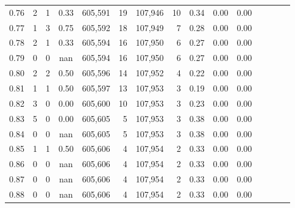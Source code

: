 \begin{tabular}{rrrcrrrrrrrrrrr}
0.76 &       2 &      1 &                                       0.33 &  605,591 &       19 &  107,946 &       10 &  0.34 &  0.00 &                         0.00 \\
0.77 &       1 &      3 &                                       0.75 &  605,592 &       18 &  107,949 &        7 &  0.28 &  0.00 &                         0.00 \\
0.78 &       2 &      1 &                                       0.33 &  605,594 &       16 &  107,950 &        6 &  0.27 &  0.00 &                         0.00 \\
0.79 &       0 &      0 &                                        nan &  605,594 &       16 &  107,950 &        6 &  0.27 &  0.00 &                         0.00 \\
0.80 &       2 &      2 &                                       0.50 &  605,596 &       14 &  107,952 &        4 &  0.22 &  0.00 &                         0.00 \\
0.81 &       1 &      1 &                                       0.50 &  605,597 &       13 &  107,953 &        3 &  0.19 &  0.00 &                         0.00 \\
0.82 &       3 &      0 &                                       0.00 &  605,600 &       10 &  107,953 &        3 &  0.23 &  0.00 &                         0.00 \\
0.83 &       5 &      0 &                                       0.00 &  605,605 &        5 &  107,953 &        3 &  0.38 &  0.00 &                         0.00 \\
0.84 &       0 &      0 &                                        nan &  605,605 &        5 &  107,953 &        3 &  0.38 &  0.00 &                         0.00 \\
0.85 &       1 &      1 &                                       0.50 &  605,606 &        4 &  107,954 &        2 &  0.33 &  0.00 &                         0.00 \\
0.86 &       0 &      0 &                                        nan &  605,606 &        4 &  107,954 &        2 &  0.33 &  0.00 &                         0.00 \\
0.87 &       0 &      0 &                                        nan &  605,606 &        4 &  107,954 &        2 &  0.33 &  0.00 &                         0.00 \\
0.88 &       0 &      0 &                                        nan &  605,606 &        4 &  107,954 &        2 &  0.33 &  0.00 &                         0.00 \\

\end{tabular}
